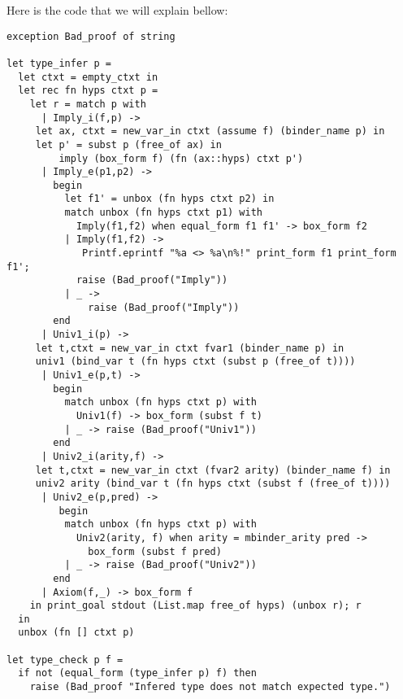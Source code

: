 \documentclass[11pt]{article}
\begin{document}
Here is the code that we will explain bellow:
\begin{verbatim}
exception Bad_proof of string

let type_infer p =
  let ctxt = empty_ctxt in
  let rec fn hyps ctxt p =
    let r = match p with
      | Imply_i(f,p) ->
	 let ax, ctxt = new_var_in ctxt (assume f) (binder_name p) in
	 let p' = subst p (free_of ax) in
         imply (box_form f) (fn (ax::hyps) ctxt p')
      | Imply_e(p1,p2) ->
        begin
          let f1' = unbox (fn hyps ctxt p2) in
          match unbox (fn hyps ctxt p1) with
            Imply(f1,f2) when equal_form f1 f1' -> box_form f2
          | Imply(f1,f2) ->
             Printf.eprintf "%a <> %a\n%!" print_form f1 print_form f1';
            raise (Bad_proof("Imply"))
          | _ ->
              raise (Bad_proof("Imply"))
        end
      | Univ1_i(p) ->
	 let t,ctxt = new_var_in ctxt fvar1 (binder_name p) in
	 univ1 (bind_var t (fn hyps ctxt (subst p (free_of t))))
      | Univ1_e(p,t) ->
        begin
          match unbox (fn hyps ctxt p) with
            Univ1(f) -> box_form (subst f t)
          | _ -> raise (Bad_proof("Univ1"))
        end
      | Univ2_i(arity,f) ->
	 let t,ctxt = new_var_in ctxt (fvar2 arity) (binder_name f) in
	 univ2 arity (bind_var t (fn hyps ctxt (subst f (free_of t))))
      | Univ2_e(p,pred) ->
         begin
          match unbox (fn hyps ctxt p) with
            Univ2(arity, f) when arity = mbinder_arity pred ->
              box_form (subst f pred)
          | _ -> raise (Bad_proof("Univ2"))
        end
      | Axiom(f,_) -> box_form f
    in print_goal stdout (List.map free_of hyps) (unbox r); r
  in
  unbox (fn [] ctxt p)

let type_check p f =
  if not (equal_form (type_infer p) f) then
    raise (Bad_proof "Infered type does not match expected type.")
\end{verbatim}
\end{document}
